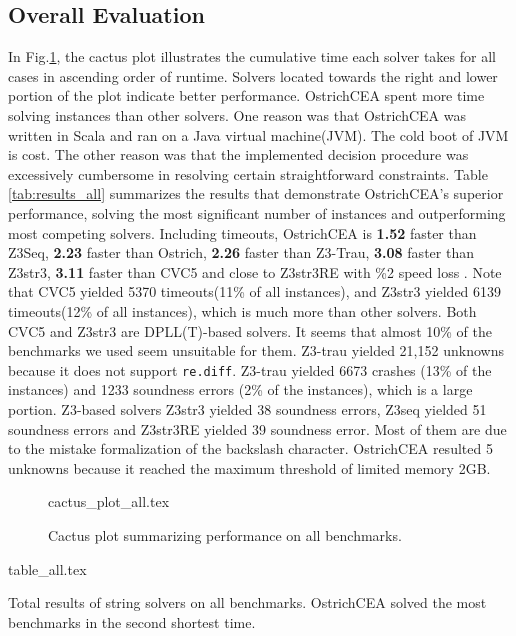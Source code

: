 \subsection{Overall Evaluation}
In Fig.\ref{fig:cactus_all}, the cactus plot illustrates the cumulative time each solver takes for all cases in ascending order of runtime. Solvers located towards the right and lower portion of the plot indicate better performance. OstrichCEA spent more time solving instances than other solvers. One reason was that OstrichCEA was written in Scala and ran on a Java virtual machine(JVM). The cold boot of JVM is cost. The other reason was that the implemented decision procedure was excessively cumbersome in resolving certain straightforward constraints. \newline
Table \ref{tab:results_all} summarizes the results that demonstrate OstrichCEA's superior performance, solving the most significant number of instances and outperforming most competing solvers. Including timeouts, OstrichCEA is \textbf{1.52}\mult{} faster than Z3Seq, \textbf{2.23}\mult{} faster than Ostrich, \textbf{2.26}\mult{} faster than Z3-Trau, \textbf{3.08}\mult{} faster than Z3str3, \textbf{3.11}\mult{} faster than CVC5 and close to Z3str3RE with \%2 speed loss . Note that CVC5\cite{cvc5} yielded 5370 timeouts(11\% of all instances), and Z3str3\cite{z3str3} yielded 6139 timeouts(12\% of all instances), which is much more than other solvers. Both CVC5 and Z3str3 are DPLL(T)-based solvers. It seems that almost 10\% of the benchmarks we used seem unsuitable for them. Z3-trau\cite{z3trau} yielded 21,152 unknowns because it does not support \verb|re.diff|. Z3-trau\cite{z3trau} yielded 6673 crashes (13\% of the instances) and 1233 soundness errors (2\% of the instances), which is a large portion. Z3-based solvers Z3str3 yielded 38 soundness errors, Z3seq\cite{z3seq} yielded 51 soundness errors and Z3str3RE\cite{z3str3re} yielded 39 soundness error. Most of them are due to the mistake formalization of the backslash character. OstrichCEA resulted 5 unknowns because it reached the maximum threshold of limited memory 2GB.

\begin{figure}[h]
  \centering
  {cactus_plot_all.tex}
  \caption{Cactus plot summarizing performance on all benchmarks.}
  \label{fig:cactus_all}
\end{figure}
\begin{table}
  {table_all.tex}
  \caption{Total results of string solvers on all benchmarks. OstrichCEA solved the most benchmarks in the second shortest time.}
  \label{tab:results_all}
\end{table}

